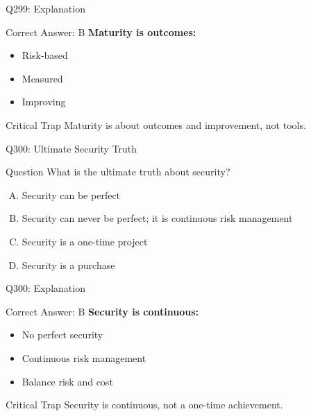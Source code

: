 \documentclass{beamer}
\begin{document}
	\begin{frame}{Q299: Explanation}
		\begin{block}{Correct Answer: B}
			\textbf{Maturity is outcomes:}
			\begin{itemize}
				\item Risk-based
				\item Measured
				\item Improving
			\end{itemize}
		\end{block}
		\begin{alertblock}{Critical Trap}
			Maturity is about outcomes and improvement, not tools.
		\end{alertblock}
	\end{frame}
	
	\begin{frame}{Q300: Ultimate Security Truth}
		\begin{block}{Question}
			What is the ultimate truth about security?
		\end{block}
		\begin{enumerate}[(A)]
			\item Security can be perfect
			\item Security can never be perfect; it is continuous risk management
			\item Security is a one-time project
			\item Security is a purchase
		\end{enumerate}
	\end{frame}
	
	\begin{frame}{Q300: Explanation}
		\begin{block}{Correct Answer: B}
			\textbf{Security is continuous:}
			\begin{itemize}
				\item No perfect security
				\item Continuous risk management
				\item Balance risk and cost
			\end{itemize}
		\end{block}
		\begin{alertblock}{Critical Trap}
			Security is continuous, not a one-time achievement.
		\end{alertblock}
	\end{frame}
	
\end{document}
